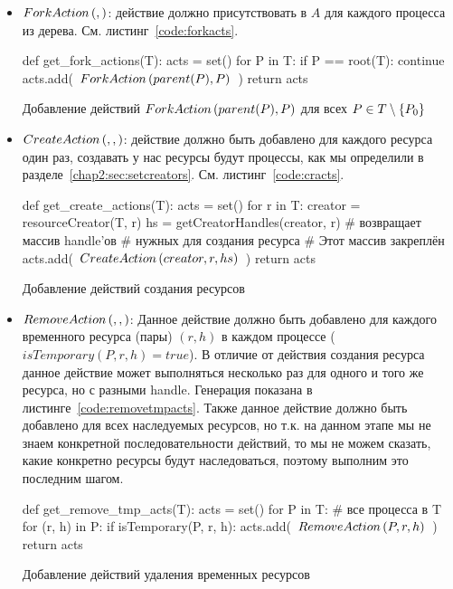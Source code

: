 \begin{itemize}
	\item $ForkAction\left( ,  \right)$: действие должно присутствовать в $A$ для каждого процесса из дерева. См. листинг~\ref{code:forkacts}.

\begin{listing}[ht!]
\begin{pythoncode}
def get_fork_actions(T):
    acts = set()
    for P in T:
        if P == root(T):
            continue
        acts.add(~$\crfork{parent(P)}{P}$~)
    return acts
\end{pythoncode}
\caption{Добавление действий $\crfork{parent(P)}{P}$ для всех $P \in T \setminus \xbrace{P_0}$}
\label{code:forkacts}
\end{listing}

	\item $CreateAction\left( , ,  \right)$: действие должно быть добавлено для каждого ресурса один раз, создавать у нас ресурсы будут процессы, как мы определили в разделе~\ref{chap2:sec:setcreators}. См. листинг~\ref{code:cracts}.

\begin{listing}[ht!]
\begin{pythoncode}
def get_create_actions(T):
    acts = set()
    for r in T:
        creator = resourceCreator(T, r)
        hs = getCreatorHandles(creator, r)   # возвращает массив handle'ов
                                             # нужных для создания ресурса
                                             # Этот массив закреплён
        acts.add(~$\crcreate{creator}{r}{hs}$~)
    return acts
\end{pythoncode}
\caption{Добавление действий создания ресурсов}
\label{code:cracts}
\end{listing}


	\item $RemoveAction\left( , ,  \right)$: Данное действие должно быть добавлено для каждого временного ресурса (пары) $(r, h)$ в каждом процессе ($isTemporary(P, r, h) = true$). В отличие от действия создания ресурса данное действие может выполняться несколько раз для одного и того же ресурса, но с разными handle. Генерация показана в листинге~\ref{code:removetmpacts}. Также данное действие должно быть добавлено для всех наследуемых ресурсов, но т.к. на данном этапе мы не знаем конкретной последовательности действий, то мы не можем сказать, какие конкретно ресурсы будут наследоваться, поэтому выполним это последним шагом.  

\begin{listing}[ht!]
\begin{pythoncode}
def get_remove_tmp_acts(T):
    acts = set()
    for P in T:  # все процесса в T
        for (r, h) in P:
            if isTemporary(P, r, h):
                acts.add(~$\crremove{P}{r}{h}$~)
    return acts
\end{pythoncode}
\caption{Добавление действий удаления временных ресурсов}
\label{code:removetmpacts}
\end{listing}


\end{itemize}
